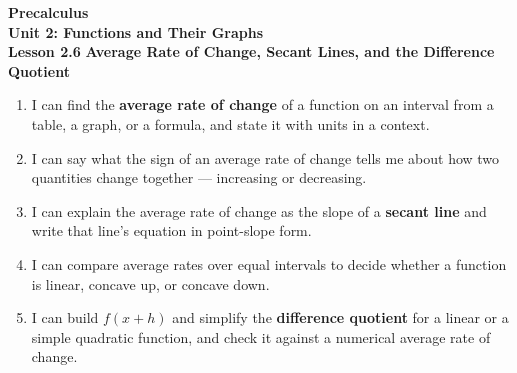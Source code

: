 \documentclass[10pt]{article}
\begin{document}
\vspace{-0.8in}

\begin{center}
  {\color{white}\textbf{\LARGE Precalculus}}\\[4pt]
  {\color{lilacmid}\large\textbf{Unit 2: Functions and Their Graphs}}\\[6pt]
  {\color{white}\textbf{\large Lesson 2.6 \quad}\textbf{\normalsize Average Rate of Change, Secant Lines, and the Difference Quotient}}
\end{center}

\vspace{0.22in}
\namedateperiod
\vspace{0.18in}

\begin{learningtargetbox}
\small
\begin{enumerate}[leftmargin=1.5em, itemsep=5pt]
  \item I can find the \textbf{average rate of change} of a function on an interval from a
        table, a graph, or a formula, and state it with units in a context.
  \item I can say what the sign of an average rate of change tells me about how two quantities
        change together --- increasing or decreasing.
  \item I can explain the average rate of change as the slope of a \textbf{secant line} and
        write that line's equation in point-slope form.
  \item I can compare average rates over equal intervals to decide whether a function is linear,
        concave up, or concave down.
  \item I can build $f(x + h)$ and simplify the \textbf{difference quotient} for a linear or a
        simple quadratic function, and check it against a numerical average rate of change.
\end{enumerate}
\end{learningtargetbox}

\vspace{0.14in}
\end{document}
